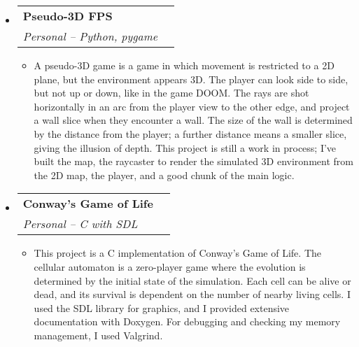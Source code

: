 \documentclass[letterpaper,12pt]{article}[leftmargin=*]
\makeatletter
\def \entryspacing {-0pt}
\newcommand{\resumeEntryStart}{\begin{itemize}[leftmargin=2.5mm]}
\newcommand{\resumeEntryEnd}{\end{itemize}\vspace{\entryspacing}}
\newcommand{\resumeItemListStart}{\begin{itemize}[leftmargin=4.5mm]}
\newcommand{\resumeItemListEnd}{\end{itemize}}
\newcommand{\resumeItem}[1]{
  \item\small{
    {#1 \vspace{-2pt}}
  }
}
\newcommand{\resumeEntryTSDL}[4]{
  \vspace{-1pt}\item[]
    \begin{tabularx}{0.97\textwidth}{X@{\hspace{60pt}}r}
      \textbf{\color{primary}#1} & {\firabook\color{accent}\small#2} \\
      \textit{\color{accent}\small#3} & \textit{\color{accent}\small#4} \\
    \end{tabularx}\vspace{-6pt}
}
\makeatother
\begin{document}
  \resumeEntryStart
    \resumeEntryTSDL
      {Pseudo-3D FPS}{}{Personal -- Python, pygame}{}
    \resumeItemListStart
      \resumeItem {A pseudo-3D game is a game in which movement is restricted to a 2D plane, but the environment appears 3D. The player can look side to side, but not up or down, like in the game DOOM. The rays are shot horizontally in an arc from the player view to the other edge, and project a wall slice when they encounter a wall. The size of the wall is determined by the distance from the player; a further distance means a smaller slice, giving the illusion of depth. This project is still a work in process; I've built the map, the raycaster to render the simulated 3D environment from the 2D map, the player, and a good chunk of the main logic.}
    \resumeItemListEnd
  \resumeEntryEnd

\resumeEntryStart
    \resumeEntryTSDL
      {Conway's Game of Life}{}{Personal -- C with SDL}{}
    \resumeItemListStart
      \resumeItem {This project is a C implementation of Conway's Game of Life. The cellular automaton is a zero-player game where the evolution is determined by the initial state of the simulation. Each cell can be alive or dead, and its survival is dependent on the number of nearby living cells. I used the SDL library for graphics, and I provided extensive documentation with Doxygen. For debugging and checking my memory management, I used Valgrind.}
    \resumeItemListEnd
  \resumeEntryEnd
\end{document}
